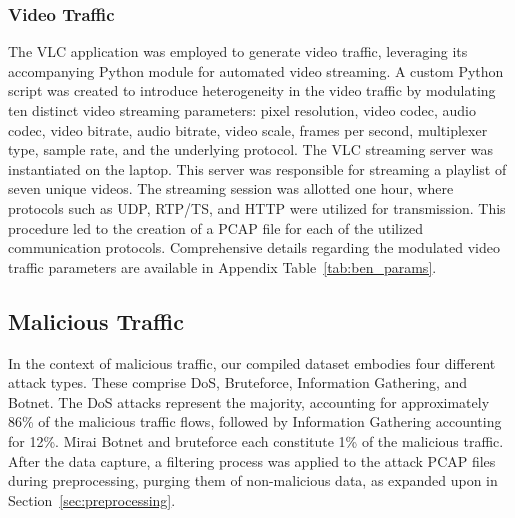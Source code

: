 \documentclass[lettersize,journal]{IEEEtran}
\begin{document}
\subsubsection{Video Traffic} \label{sec:video}
The \ac{VLC} application was employed to generate video traffic, leveraging its accompanying Python module for automated video streaming. A custom Python script was created to introduce heterogeneity in the video traffic by modulating ten distinct video streaming parameters: pixel resolution, video codec, audio codec, video bitrate, audio bitrate, video scale, frames per second, multiplexer type, sample rate, and the underlying protocol. The \ac{VLC} streaming server was instantiated on the laptop. This server was responsible for streaming a playlist of seven unique videos. The streaming session was allotted one hour, where protocols such as \ac{UDP}, \ac{RTP}/\ac{TS}, and \ac{HTTP} were utilized for transmission. This procedure led to the creation of a \ac{PCAP} file for each of the utilized communication protocols. Comprehensive details regarding the modulated video traffic parameters are available in Appendix Table~\ref{tab:ben_params}.

\subsection{Malicious Traffic} \label{sec:mal_traffic}
In the context of malicious traffic, our compiled dataset embodies four different attack types. These comprise \ac{DoS}, Bruteforce, Information Gathering, and Botnet. The \ac{DoS} attacks represent the majority, accounting for approximately 86\% of the malicious traffic flows, followed by Information Gathering accounting for 12\%. Mirai Botnet and bruteforce each constitute 1\% of the malicious traffic.  After the data capture, a filtering process was applied to the attack \ac{PCAP} files during preprocessing, purging them of non-malicious data, as expanded upon in Section~\ref{sec:preprocessing}.  
\end{document}
